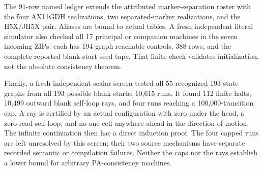 The 91-row named ledger extends the attributed marker-separation roster
with the four AX11GDH realizations, two separated-marker realizations, and
the H5X/JH5X pair. Aliases are bound to actual tables. A fresh independent
literal simulator also checked all 17 principal or companion machines in
the seven incoming ZIPs: each has 194 graph-reachable controls, 388 rows,
and the complete reported blank-start seed tape. That finite check
validates initialization, not the absolute consistency theorem.

Finally, a fresh independent scalar screen tested all 55 recognized
193-state graphs from all 193 possible blank starts: 10,615 runs.
It found 112 finite halts, 10,499 outward blank self-loop rays, and four
runs reaching a 100,000-transition cap. A ray is certified by an actual
configuration with zero under the head, a zero-read self-loop, and no
one-cell anywhere ahead in the direction of motion. The infinite
continuation then has a direct induction proof. The four capped runs are
left unresolved by this screen; their two source mechanisms have separate
recorded semantic or compilation failures. Neither the caps nor the rays
establish a lower bound for arbitrary PA-consistency machines.

